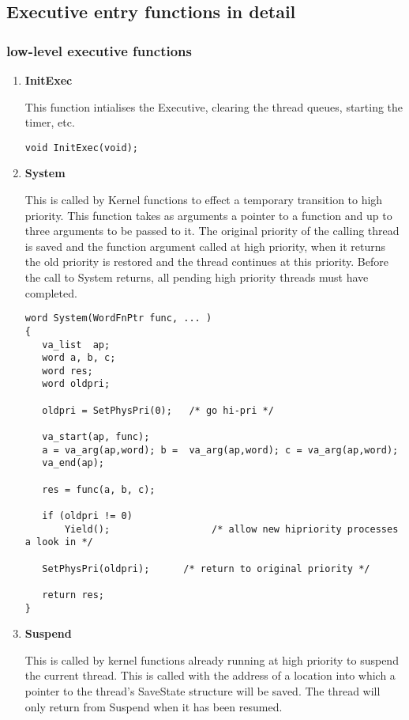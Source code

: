 \subsection{Executive entry functions in detail}
\subsubsection{low-level executive functions}

\begin{enumerate}

\item {\bf InitExec}

This function intialises the Executive, clearing the thread queues,
starting the timer, etc.

\scriptsize
\begin{verbatim}
void InitExec(void);
\end{verbatim}
\normalsize

\item {\bf System}

This is called by Kernel functions to effect a temporary
transition to high priority.
This function takes as arguments a pointer to a function and up to three
arguments to be passed to it.
The original priority of the calling thread is saved and the function
argument called at high priority, when it returns the old priority is
restored and the thread continues at this priority.
Before the call to System returns, all pending high priority threads
must have completed.

\scriptsize
\begin{verbatim}
word System(WordFnPtr func, ... )
{
   va_list  ap;
   word a, b, c;
   word res;
   word oldpri;

   oldpri = SetPhysPri(0);   /* go hi-pri */

   va_start(ap, func);
   a = va_arg(ap,word); b =  va_arg(ap,word); c = va_arg(ap,word);
   va_end(ap);

   res = func(a, b, c);

   if (oldpri != 0)
       Yield();                  /* allow new hipriority processes a look in */

   SetPhysPri(oldpri);      /* return to original priority */

   return res;
}
\end{verbatim}
\normalsize

\item {\bf Suspend}

This is called by kernel functions already running at high priority
to suspend the current thread.
This is called with the address of a location into which a pointer to the
thread's SaveState structure will be saved.
The thread will only return from Suspend when it has been resumed.


\end{enumerate}
